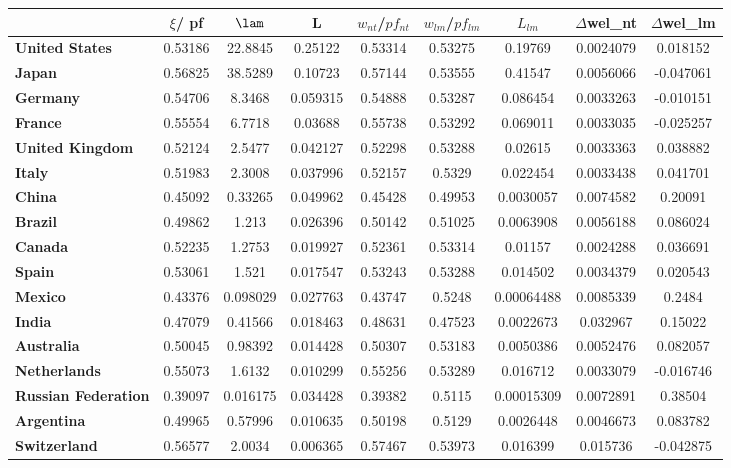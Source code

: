 \begin{tiny}\begin{tabular}{|l|c|c|c|c|c|c|c|c|}
\hline
&\textbf{$\xi$/ pf}&\textbf{$\lam$}&\textbf{L}&\textbf{$w_{nt}$/$pf_{nt}$}&\textbf{$w_{lm}$/$pf_{lm}$}&\textbf{$L_{lm}$}&\textbf{$\Delta$wel\_nt}&\textbf{$\Delta$wel\_lm}\\\hline
\textbf{United States}&0.53186&22.8845&0.25122&0.53314&0.53275&0.19769&0.0024079&0.018152\\\hline
\textbf{Japan}&0.56825&38.5289&0.10723&0.57144&0.53555&0.41547&0.0056066&-0.047061\\\hline
\textbf{Germany}&0.54706&8.3468&0.059315&0.54888&0.53287&0.086454&0.0033263&-0.010151\\\hline
\textbf{France}&0.55554&6.7718&0.03688&0.55738&0.53292&0.069011&0.0033035&-0.025257\\\hline
\textbf{United Kingdom}&0.52124&2.5477&0.042127&0.52298&0.53288&0.02615&0.0033363&0.038882\\\hline
\textbf{Italy}&0.51983&2.3008&0.037996&0.52157&0.5329&0.022454&0.0033438&0.041701\\\hline
\textbf{China}&0.45092&0.33265&0.049962&0.45428&0.49953&0.0030057&0.0074582&0.20091\\\hline
\textbf{Brazil}&0.49862&1.213&0.026396&0.50142&0.51025&0.0063908&0.0056188&0.086024\\\hline
\textbf{Canada}&0.52235&1.2753&0.019927&0.52361&0.53314&0.01157&0.0024288&0.036691\\\hline
\textbf{Spain}&0.53061&1.521&0.017547&0.53243&0.53288&0.014502&0.0034379&0.020543\\\hline
\textbf{Mexico}&0.43376&0.098029&0.027763&0.43747&0.5248&0.00064488&0.0085339&0.2484\\\hline
\textbf{India}&0.47079&0.41566&0.018463&0.48631&0.47523&0.0022673&0.032967&0.15022\\\hline
\textbf{Australia}&0.50045&0.98392&0.014428&0.50307&0.53183&0.0050386&0.0052476&0.082057\\\hline
\textbf{Netherlands}&0.55073&1.6132&0.010299&0.55256&0.53289&0.016712&0.0033079&-0.016746\\\hline
\textbf{Russian Federation}&0.39097&0.016175&0.034428&0.39382&0.5115&0.00015309&0.0072891&0.38504\\\hline
\textbf{Argentina}&0.49965&0.57996&0.010635&0.50198&0.5129&0.0026448&0.0046673&0.083782\\\hline
\textbf{Switzerland}&0.56577&2.0034&0.006365&0.57467&0.53973&0.016399&0.015736&-0.042875\\\hline

\end{tabular}
\end{tiny}
